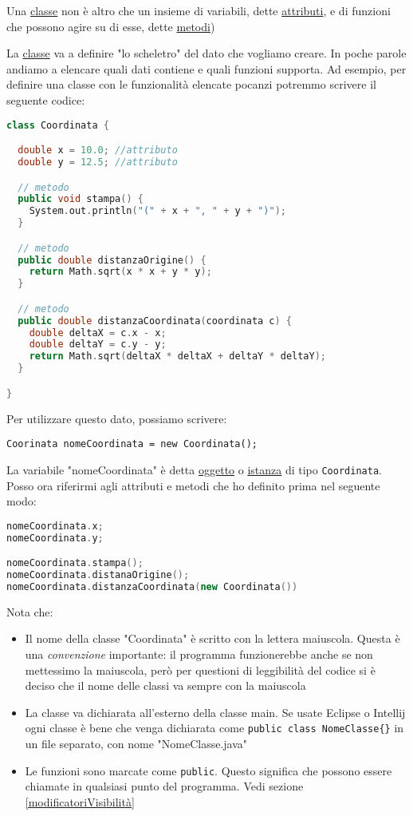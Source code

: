 \begin{tcolorbox}
	Una \underline{classe} non è altro che un insieme di variabili, dette \underline{attributi}, e di funzioni che possono agire su di esse, dette \underline{metodi})
\end{tcolorbox}

La \underline{classe} va a definire "lo scheletro" del dato che vogliamo creare. In poche parole andiamo a elencare quali dati contiene e quali funzioni supporta. Ad esempio, per definire una classe con le funzionalità elencate pocanzi potremmo scrivere il seguente codice:
\vskip3mm
\begin{lstlisting}[language = c++, frame = none]
class Coordinata {

  double x = 10.0; //attributo
  double y = 12.5; //attributo

  // metodo
  public void stampa() {
    System.out.println("(" + x + ", " + y + ")");
  }

  // metodo
  public double distanzaOrigine() {
    return Math.sqrt(x * x + y * y);
  }

  // metodo
  public double distanzaCoordinata(coordinata c) {
    double deltaX = c.x - x;
    double deltaY = c.y - y;
    return Math.sqrt(deltaX * deltaX + deltaY * deltaY);
  }

}
\end{lstlisting}
\vskip3mm
Per utilizzare questo dato, possiamo scrivere:
\begin{center}
	\verb|Coorinata nomeCoordinata = new Coordinata();|
\end{center}
La variabile "nomeCoordinata" è detta \underline{oggetto} o \underline{istanza} di tipo \verb|Coordinata|. Posso ora riferirmi agli attributi e metodi che ho definito prima nel seguente modo:
\begin{lstlisting}[language = c++, frame = none]
nomeCoordinata.x;
nomeCoordinata.y;

nomeCoordinata.stampa();
nomeCoordinata.distanaOrigine();
nomeCoordinata.distanzaCoordinata(new Coordinata())
\end{lstlisting}
\vskip3mm
Nota che:
\begin{itemize}
	\item Il nome della classe "Coordinata" è scritto con la lettera maiuscola. Questa è una \textit{convenzione} importante: il programma funzionerebbe anche se non mettessimo la maiuscola, però per questioni di leggibilità del codice si è deciso che il nome delle classi va sempre con la maiuscola
	\item La classe va dichiarata all'esterno della classe main. Se usate Eclipse o Intellij ogni classe è bene che venga dichiarata come \verb|public class NomeClasse{}| in un file separato, con nome "NomeClasse.java"
	\item Le funzioni sono marcate come \verb|public|. Questo significa che possono essere chiamate in qualsiasi punto del programma. Vedi sezione \ref{modificatoriVisibilità}
\end{itemize}
